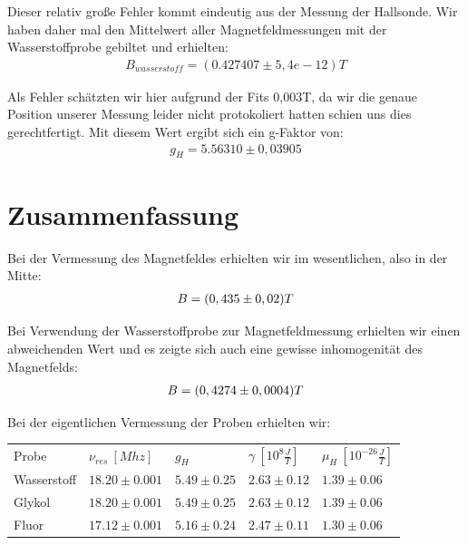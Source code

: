 \documentclass[12pt]{article}
\begin{document}
Dieser relativ große Fehler kommt eindeutig aus der Messung der Hallsonde. Wir haben daher mal den Mittelwert aller Magnetfeldmessungen mit der Wasserstoffprobe gebiltet und erhielten:
\begin{align}
 B_{wasserstoff}= (0.427407 \pm 5,4e-12) T
\end{align}

Als Fehler schätzten wir hier aufgrund der Fits 0,003T, da wir die genaue Position unserer Messung leider nicht protokoliert hatten schien uns dies gerechtfertigt. Mit diesem Wert ergibt sich ein g-Faktor von:
\begin{align}
 g_H =  5.56310 \pm  0,03905
\end{align}

\section{Zusammenfassung}

Bei der Vermessung des Magnetfeldes erhielten wir im wesentlichen, also in der Mitte:
\begin{align}
 \notag B=(0,435 \pm 0,02) T
\end{align}

Bei Verwendung der Wasserstoffprobe zur Magnetfeldmessung erhielten wir einen abweichenden Wert und es zeigte sich auch eine gewisse inhomogenität des Magnetfelds:
\begin{align}
 \notag B=(0,4274 \pm 0,0004) T
\end{align}

Bei der eigentlichen Vermessung der Proben erhielten wir:
\begin{center}
\begin{tabular}{l|llll}
Probe & $\nu_{res}~[Mhz]$ & $g_H$ & $\gamma~[10^8\frac{J}{T}]$ & $\mu_H~[10^{-26}\frac{J}{T}]$ \\ 
Wasserstoff & $18.20\pm0.001$ & $5.49\pm0.25$ & $2.63\pm0.12$ & $1.39\pm0.06$ \\ 
Glykol & $18.20\pm0.001$ & $5.49\pm0.25$ & $2.63\pm0.12$ & $1.39\pm0.06$ \\ 
Fluor & $17.12\pm0.001$ & $5.16\pm0.24$ & $2.47\pm0.11$ & $1.30\pm0.06$


\end{tabular}
\end{center}
\end{document}
